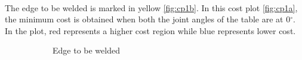 \\
The edge to be welded is marked in yellow \ref{fig:cp1b}. In this cost plot \ref{fig:cp1a}, the minimum cost is obtained when both the joint angles of the table are at 0$^{\circ}$. In the plot, red represents a higher cost region while blue represents lower cost.

\begin{figure}[!htbp] %
	\centering
	\begin{subfigure}[b]{0.4\textwidth}
		\caption{Edge to be welded}  
		\label{fig:cp2b}
	\end{subfigure}
	\begin{subfigure}[b]{0.4\textwidth}

\end{subfigure}
\end{figure}
